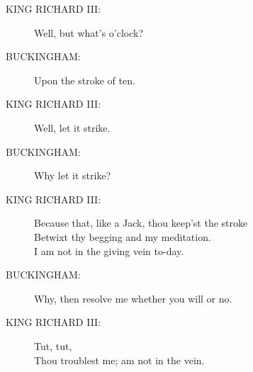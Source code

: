 \documentclass{article}
\begin{document}
\begin{description}
\item[KING RICHARD III:] 
\hspace{1pt}Well, but what's o'clock?\\
\end{description}
\begin{description}
\item[BUCKINGHAM:] 
\hspace{1pt}Upon the stroke of ten.\\
\end{description}
\begin{description}
\item[KING RICHARD III:] 
\hspace{1pt}Well, let it strike.\\
\end{description}
\begin{description}
\item[BUCKINGHAM:] 
\hspace{1pt}Why let it strike?\\
\end{description}
\begin{description}
\item[KING RICHARD III:] 
\hspace{1pt}Because that, like a Jack, thou keep'st the stroke\\
\hspace{1pt}Betwixt thy begging and my meditation.\\
\hspace{1pt}I am not in the giving vein to-day.\\
\end{description}
\begin{description}
\item[BUCKINGHAM:] 
\hspace{1pt}Why, then resolve me whether you will or no.\\
\end{description}
\begin{description}
\item[KING RICHARD III:] 
\hspace{1pt}Tut, tut,\\
\hspace{1pt}Thou troublest me; am not in the vein.\\
\end{description}
\\
\end{document}
